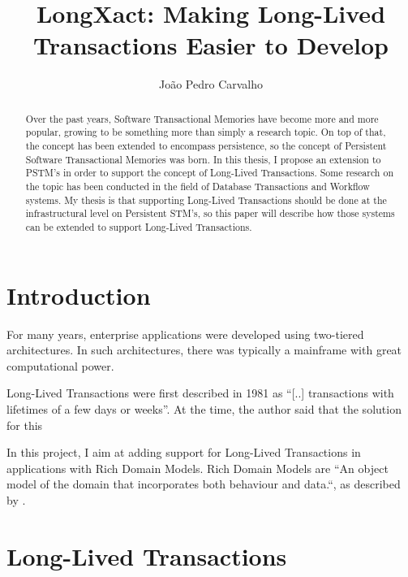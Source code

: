\documentclass{llncs}
\begin{document}
\title{LongXact: Making Long-Lived Transactions Easier to Develop}

\author{Jo\~{a}o Pedro Carvalho}
\maketitle


\begin{abstract}
Over the past years, Software Transactional Memories have become more
and more popular, growing to be something more than simply a research topic. On top of
that, the concept has been extended to encompass persistence, so
the concept of Persistent Software Transactional Memories was born. In
this thesis, I propose an extension to PSTM's in order to support the
concept of Long-Lived Transactions. Some research on the topic has
been conducted in the field of Database Transactions and Workflow
systems. My thesis is that supporting Long-Lived Transactions should
be done at the infrastructural level on Persistent STM's, so this
paper will describe how those systems can be extended to support
Long-Lived Transactions.
\end{abstract}


\section{Introduction}

For many years, enterprise applications were developed using
two-tiered architectures. In such architectures, there was typically a
mainframe with great computational power.

Long-Lived Transactions were first described in
1981 as ``[..] transactions with lifetimes of a few days or
weeks''\cite{gray1981transaction}. At the time, the author said that the
solution for this 

In this project, I aim at adding support for Long-Lived Transactions
in applications with Rich Domain Models.
Rich Domain Models are ``An object model of the domain that
incorporates both behaviour and data.``, as described by \cite{fowler2003patterns}.

\section{Long-Lived Transactions}
\end{document}
